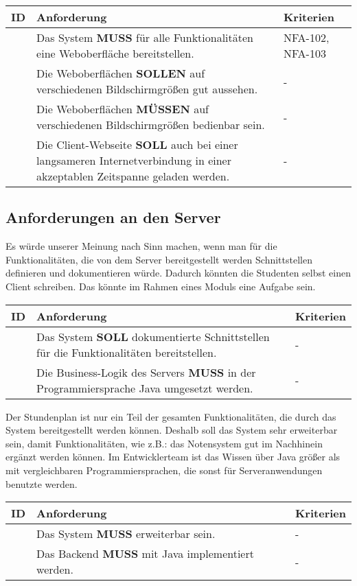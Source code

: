 \vspace{12pt}

\begin{tabular} {|p{}|p{}|p{}|}
	\hline
	ID & Anforderung & Kriterien \\
	\hline
	\printnfreqnr
	& Das System \textbf{MUSS} für alle Funktionalitäten eine Weboberfläche bereitstellen. 
	& NFA-102, NFA-103 \\
	\hline
	\printnfreqnr
	& Die Weboberflächen \textbf{SOLLEN} auf verschiedenen Bildschirmgrößen gut aussehen.
	& -  \\
	\hline
	\printnfreqnr
	& Die Weboberflächen \textbf{MÜSSEN} auf verschiedenen Bildschirmgrößen bedienbar sein.
	& - \\
	\hline
	\printnfreqnr
	& Die Client-Webseite \textbf{SOLL} auch bei einer langsameren Internetverbindung in einer akzeptablen Zeitspanne geladen werden.
	& - \\
	\hline
\end{tabular}

\newpage

\subsection{Anforderungen an den Server}
Es würde unserer Meinung nach Sinn machen, wenn man für die Funktionalitäten, die von dem Server bereitgestellt werden Schnittstellen definieren und dokumentieren würde. Dadurch könnten die Studenten selbst einen Client schreiben. Das könnte im Rahmen eines Moduls eine Aufgabe sein. 

\vspace{12pt}

\begin{tabular} {|p{}|p{}|p{}|}
	\hline
	ID & Anforderung & Kriterien \\
	\hline
	\printnfreqnr 
	& Das System \textbf{SOLL} dokumentierte Schnittstellen für die Funktionalitäten bereitstellen.
	& - \\
	\hline
	\printnfreqnr 
	& Die Business-Logik des Servers \textbf{MUSS} in der Programmiersprache Java umgesetzt werden.
	& - \\
	\hline
\end{tabular}

\vspace{12pt}

Der Stundenplan ist nur ein Teil der gesamten Funktionalitäten, die durch das System bereitgestellt werden können. Deshalb soll das System sehr erweiterbar sein, damit Funktionalitäten, wie z.B.: das Notensystem gut im Nachhinein ergänzt werden können. Im Entwicklerteam ist das Wissen über Java größer als mit vergleichbaren Programmiersprachen, die sonst für Serveranwendungen benutzte werden.

\vspace{12pt}

\begin{tabular} {|p{}|p{}|p{}|}
	\hline
	ID & Anforderung & Kriterien \\
	\hline
	\printnfreqnr
	& Das System \textbf{MUSS} erweiterbar sein.
	& - \\
	\hline
	\printnfreqnr
	& Das Backend \textbf{MUSS} mit Java implementiert werden.
	& - \\
	\hline
\end{tabular}